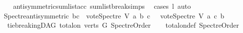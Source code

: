 \begin{isabellebody}
%
\isadelimproof
\ \ %
\endisadelimproof
%
\isatagproof
{}\isamarkupfalse%
\ antisymmetric{\isacharunderscore}{\kern0pt}sumlist{\isacharunderscore}{\kern0pt}acc\ sumlist{\isacharunderscore}{\kern0pt}break{\isachardot}{\kern0pt}simps{\isacharparenleft}{\kern0pt}{}{\isacharparenright}{\kern0pt}\ \isamarkupfalse%
\ {\isacharparenleft}{\kern0pt}cases\ l{\isacharparenright}{\kern0pt}\ auto%
\endisatagproof
{\isafoldproof}%
%
\isadelimproof
\isanewline
%
\endisadelimproof
\ \ \isanewline
\isanewline
{}\isamarkupfalse%
\ Spectre{\isacharunderscore}{\kern0pt}antisymmetric{\isacharcolon}{\kern0pt}\ {\isachardoublequoteopen}b{\isasymnoteq}c\ {\isasymLongrightarrow}\ {\isacharparenleft}{\kern0pt}vote{\isacharunderscore}{\kern0pt}Spectre\ V\ a\ b\ c{\isacharparenright}{\kern0pt}\ {\isacharequal}{\kern0pt}\ {\isacharminus}{\kern0pt}\ {\isacharparenleft}{\kern0pt}vote{\isacharunderscore}{\kern0pt}Spectre\ V\ a\ c\ b{\isacharparenright}{\kern0pt}{\isachardoublequoteclose}\isanewline
%
\isadelimproof
\ \ %
\endisadelimproof
%
\isatagproof
{}\isamarkupfalse%
%
\endisatagproof
{\isafoldproof}%
%
\isadelimproof
\isanewline
%
\endisadelimproof
\ \ \isanewline
{}\isamarkupfalse%
\ {\isacharparenleft}{\kern0pt}\ tie{\isacharunderscore}{\kern0pt}breakingDAG{\isacharparenright}{\kern0pt}\ {\isachardoublequoteopen}total{\isacharunderscore}{\kern0pt}on\ {\isacharparenleft}{\kern0pt}verts\ G{\isacharparenright}{\kern0pt}\ SpectreOrder{\isachardoublequoteclose}\isanewline
%
\isadelimproof
\ \ %
\endisadelimproof
%
\isatagproof
{}\isamarkupfalse%
\ total{\isacharunderscore}{\kern0pt}on{\isacharunderscore}{\kern0pt}def\ SpectreOrder\ \isanewline
\ \ \isamarkupfalse%
%
\endisatagproof
{\isafoldproof}%
%
\isadelimproof
\isanewline
%
\endisadelimproof
%
\isadelimtheory
\isanewline
%
\endisadelimtheory
%
\isatagtheory
{}\isamarkupfalse%
%
\endisatagtheory
{\isafoldtheory}%
%
\isadelimtheory
%
\endisadelimtheory
%
\end{isabellebody}%
\endinput
